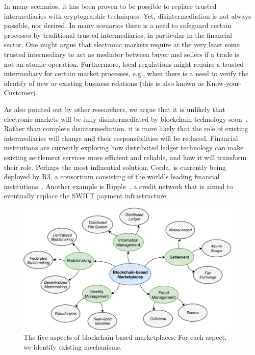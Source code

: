 In many scenarios, it has been proven to be possible to replace trusted intermediaries with cryptographic techniques.
Yet, disintermediation is not always possible, nor desired.
In many scenarios there is a need to safeguard certain processes by traditional trusted intermediaries, in particular in the financial sector.
One might argue that electronic markets require at the very least some trusted intermediary to act as mediator between buyer and sellers if a trade is not an atomic operation.
Furthermore, local regulations might require a trusted intermediary for certain market processes, e.g., when there is a need to verify the identify of new or existing business relations (this is also known as Know-your-Customer).

As also pointed out by other researchers, we argue that it is unlikely that electronic markets will be fully disintermediated by blockchain technology soon~\cite{zamani2018little}.
Rather than complete disintermediation, it is more likely that the role of existing intermediaries will change and their responsibilities will be reduced.
Financial institutions are currently exploring how distributed ledger technology can make existing settlement services more efficient and reliable, and how it will transform their role.
Perhaps the most influential solution, Corda, is currently being deployed by R3, a consortium consisting of the world's leading financial institutions~\cite{brown2016introducing}.
Another example is Ripple~\cite{armknecht2015ripple}, a credit network that is aimed to eventually replace the SWIFT payment infrastructure.

\begin{figure}[t]
	\centering
	\includegraphics[width=\linewidth]{introduction/assets/decomposition}
	\caption{The five aspects of blockchain-based marketplaces. For each aspect, we identify existing mechanisms.}
	\label{fig:electronic_markets}
\end{figure}

